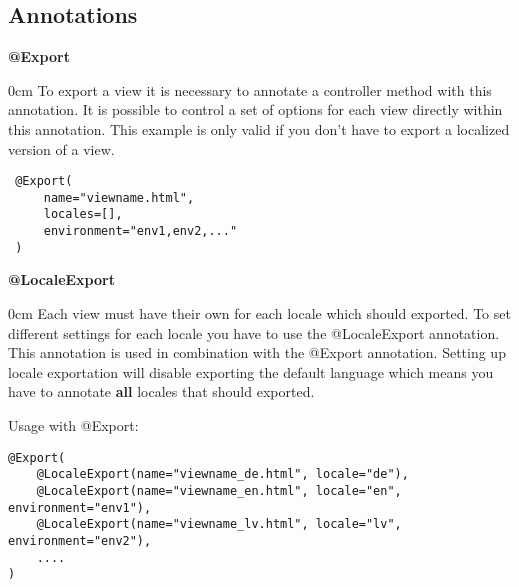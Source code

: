 \subsection{Annotations}

\noindent
\begin{minipage}{\textwidth}
\textbf{@Export}\\
\vspace{-1em}
\begin{adjustwidth}{\parindent}{0cm}
To export a view it is necessary to annotate a controller method with this annotation. It is possible to control a set of options for each view directly within this annotation. This example is only valid if you don't have to export a localized version of a view.

\begin{verbatim}
 @Export(
     name="viewname.html",
     locales=[],
     environment="env1,env2,..."
 )
\end{verbatim}
\end{adjustwidth}
\vspace{1em}
\end{minipage}

\noindent
\begin{minipage}{\textwidth}
\textbf{@LocaleExport}\\
\vspace{-1em}
\begin{adjustwidth}{\parindent}{0cm}
Each view must have their own for each locale which should exported. To set different settings for each locale you have to use the @LocaleExport annotation. This annotation is used in combination with the @Export annotation. Setting up locale exportation will disable exporting the default language which means you have to annotate \textbf{all} locales that should exported.

Usage with @Export:
\begin{verbatim}
@Export(
    @LocaleExport(name="viewname_de.html", locale="de"),
    @LocaleExport(name="viewname_en.html", locale="en", environment="env1"),
    @LocaleExport(name="viewname_lv.html", locale="lv", environment="env2"),
    ....
)
\end{verbatim}
\end{adjustwidth}
\vspace{1em}
\end{minipage}

